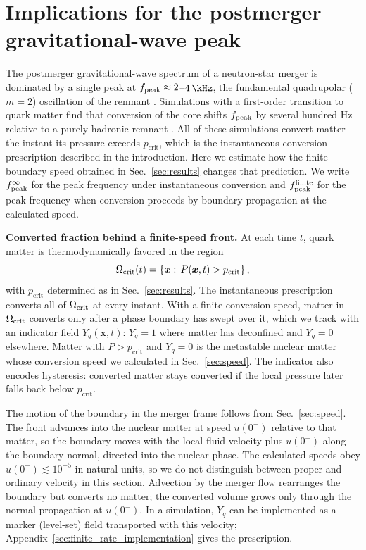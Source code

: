 \section{Implications for the postmerger gravitational-wave peak}
\label{sec:gw}

The postmerger gravitational-wave spectrum of a neutron-star merger is dominated by a single peak at $f_{\rm peak}\approx2$--$4\,\kHz$, the fundamental quadrupolar ($m=2$) oscillation of the remnant \cite{Stergioulas:2011gd,Takami:2014tva}.
Simulations with a first-order transition to quark matter find that conversion of the core shifts $f_{\rm peak}$ by several hundred Hz relative to a purely hadronic remnant \cite{Bauswein:2018bma,Most:2018eaw,Weih:2019xvw,Bauswein:2020ggy,Fujimoto:2022xhv,Espino:2023llj}.
All of these simulations convert matter the instant its pressure exceeds $p_\text{crit}$, which is the instantaneous-conversion prescription described in the introduction.
Here we estimate how the finite boundary speed obtained in Sec.~\ref{sec:results} changes that prediction.
We write $f_{\rm peak}^{\infty}$ for the peak frequency under instantaneous conversion and $f_{\rm peak}^{\rm finite}$ for the peak frequency when conversion proceeds by boundary propagation at the calculated speed.

\textbf{Converted fraction behind a finite-speed front.}
At each time $t$, quark matter is thermodynamically favored in the region
\begin{equation}
\Omega_{\rm crit}(t)
=\left\{\boldsymbol{x}:\,P(\boldsymbol{x},t)>p_\text{crit}\right\},
\label{eq:critical_region}
\end{equation}
with $p_\text{crit}$ determined as in Sec.~\ref{sec:results}.
The instantaneous prescription converts all of $\Omega_{\rm crit}$ at every instant.
With a finite conversion speed, matter in $\Omega_{\rm crit}$ converts only after a phase boundary has swept over it, which we track with an indicator field $Y_q(\boldsymbol{x},t)$: $Y_q=1$ where matter has deconfined and $Y_q=0$ elsewhere.
Matter with $P>p_\text{crit}$ and $Y_q=0$ is the metastable nuclear matter whose conversion speed we calculated in Sec.~\ref{sec:speed}.
The indicator also encodes hysteresis: converted matter stays converted if the local pressure later falls back below $p_\text{crit}$.

The motion of the boundary in the merger frame follows from Sec.~\ref{sec:speed}.
The front advances into the nuclear matter at speed $u(0^-)$ relative to that matter, so the boundary moves with the local fluid velocity plus $u(0^-)$ along the boundary normal, directed into the nuclear phase.
The calculated speeds obey $u(0^-)\lesssim10^{-5}$ in natural units, so we do not distinguish between proper and ordinary velocity in this section.
Advection by the merger flow rearranges the boundary but converts no matter; the converted volume grows only through the normal propagation at $u(0^-)$.
In a simulation, $Y_q$ can be implemented as a marker (level-set) field transported with this velocity; Appendix~\ref{sec:finite_rate_implementation} gives the prescription.

